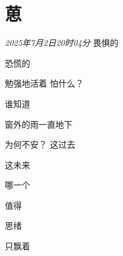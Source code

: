 \section*{葸}
\begin{center}
\textit{2025年7月2日20时04分}\hh 
畏惧的

恐慌的

勉强地活着\hh
怕什么？

谁知道\hh

窗外的雨一直地下

为何不安？\hh
这过去

这未来

哪一个

值得\hh

思绪

只飘着
\end{center}